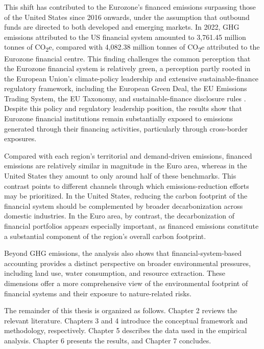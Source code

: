 This shift has contributed to the Eurozone’s financed emissions surpassing those of the United States since 2016 onwards, under the assumption that outbound funds are directed to both developed and emerging markets. In 2022, GHG emissions attributed to the US financial system amounted to 3,761.45 million tonnes of CO\textsubscript{2}e, compared with 4,082.38 million tonnes of CO\textsubscript{2}e attributed to the Eurozone financial centre. This finding challenges the common perception that the Eurozone financial system is relatively green, a perception partly rooted in the European Union’s climate-policy leadership and extensive sustainable-finance regulatory framework, including the European Green Deal, the EU Emissions Trading System, the EU Taxonomy, and sustainable-finance disclosure rules \citep{merler_silvia_how_2025}. Despite this policy and regulatory leadership position, the results show that Eurozone financial institutions remain substantially exposed to emissions generated through their financing activities, particularly through cross-border exposures.

Compared with each region’s territorial and demand-driven emissions, financed emissions are relatively similar in magnitude in the Euro area, whereas in the United States they amount to only around half of these benchmarks. This contrast points to different channels through which emissions-reduction efforts may be prioritized. In the United States, reducing the carbon footprint of the financial system should be complemented by broader decarbonization across domestic industries. In the Euro area, by contrast, the decarbonization of financial portfolios appears especially important, as financed emissions constitute a substantial component of the region’s overall carbon footprint.


Beyond GHG emissions, the analysis also shows that financial-system-based accounting provides a distinct perspective on broader environmental pressures, including land use, water consumption, and resource extraction. These dimensions offer a more comprehensive view of the environmental footprint of financial systems and their exposure to nature-related risks.

The remainder of this thesis is organized as follows. Chapter 2 reviews the relevant literature. Chapters 3 and 4 introduce the conceptual framework and methodology, respectively. Chapter 5 describes the data used in the empirical analysis. Chapter 6 presents the results, and Chapter 7 concludes.